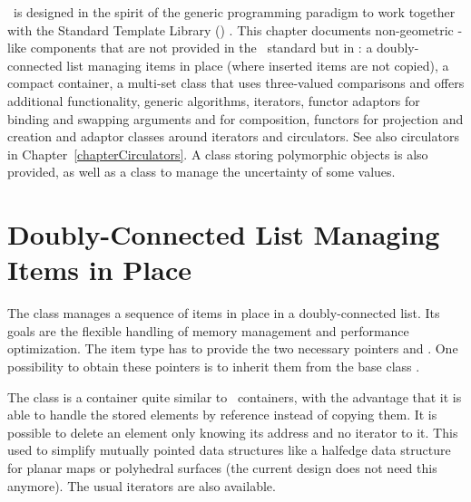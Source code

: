 


\minitoc

\cgal\ is designed in the spirit of the generic programming paradigm
to work together with the Standard Template Library (\stl)
\cite{cgal:ansi-is14882-98,cgal:a-gps-98}. This chapter documents non-geometric
\stl-like components that are not provided in the \stl\ standard but
in \cgal: a doubly-connected list managing items in place (where
inserted items are not copied), a compact container, a multi-set class that
uses three-valued comparisons and offers additional functionality,
generic algorithms, iterators, functor adaptors for binding and swapping
arguments and for composition, functors for projection and creation and
adaptor classes around iterators and circulators. See also circulators in
Chapter~\ref{chapterCirculators}.  A class storing polymorphic objects
is also provided, as well as a class to manage the uncertainty of some values.

\section{Doubly-Connected List Managing Items in Place}

The class  manages a
sequence of items in place in a doubly-connected list. Its goals are
the flexible handling of memory management and performance
optimization. The item type has to provide the two necessary
pointers  and . One possibility
to obtain these pointers is to inherit them from the base class
.

The class  is a container quite similar
to \stl\ containers, with the advantage that it is able to handle the
stored elements by reference instead of copying them. It is possible
to delete an element only knowing its address and no iterator to it.
This used to simplify mutually pointed data structures like a halfedge
data structure for planar maps or polyhedral surfaces (the current design
does not need this anymore). The usual iterators are also available.


